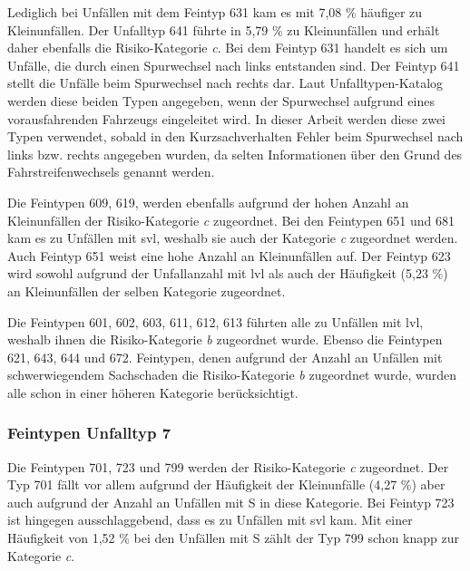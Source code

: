 Lediglich bei Unfällen mit dem Feintyp 631 kam es mit 7,08 \% häufiger zu Kleinunfällen. Der Unfalltyp 641 führte in 5,79 \% zu Kleinunfällen und erhält daher ebenfalls die Risiko-Kategorie \textit{c}. Bei dem Feintyp 631 handelt es sich um Unfälle, die durch einen Spurwechsel nach links entstanden sind. Der Feintyp 641 stellt die Unfälle beim Spurwechsel nach rechts dar. Laut Unfalltypen-Katalog werden diese beiden Typen angegeben, wenn der Spurwechsel aufgrund eines vorausfahrenden Fahrzeugs eingeleitet wird. In dieser Arbeit werden diese zwei Typen verwendet, sobald in den Kurzsachverhalten Fehler beim Spurwechsel nach links bzw. rechts angegeben wurden, da selten Informationen über den Grund des Fahrstreifenwechsels genannt werden.  

Die Feintypen 609, 619, werden ebenfalls aufgrund der hohen Anzahl an Kleinunfällen der Risiko-Kategorie \textit{c} zugeordnet. Bei den Feintypen 651 und 681 kam es zu Unfällen mit \ac{svl}, weshalb sie auch der Kategorie \textit{c} zugeordnet werden. Auch Feintyp 651 weist eine hohe Anzahl an Kleinunfällen auf. Der Feintyp 623 wird sowohl aufgrund der Unfallanzahl mit \ac{lvl} als auch der Häufigkeit (5,23 \%) an Kleinunfällen der selben Kategorie zugeordnet.

Die Feintypen 601, 602, 603, 611, 612, 613 führten alle zu Unfällen mit \ac{lvl}, weshalb ihnen die Risiko-Kategorie \textit{b} zugeordnet wurde. Ebenso die Feintypen 621, 643, 644 und 672. Feintypen, denen aufgrund der Anzahl an Unfällen mit schwerwiegendem Sachschaden die Risiko-Kategorie \textit{b} zugeordnet wurde, wurden alle schon in einer höheren Kategorie berücksichtigt.   

\subsubsection{Feintypen Unfalltyp 7}
Die Feintypen 701, 723 und 799 werden der Risiko-Kategorie \textit{c} zugeordnet. Der Typ 701 fällt vor allem aufgrund der Häufigkeit der Kleinunfälle (4,27 \%) aber auch aufgrund der Anzahl an Unfällen mit \ac{S} in diese Kategorie. Bei Feintyp 723 ist hingegen ausschlaggebend, dass es zu Unfällen mit \ac{svl} kam. Mit einer Häufigkeit von 1,52 \% bei den Unfällen mit \ac{S} zählt der Typ 799 schon knapp zur Kategorie \textit{c}.

